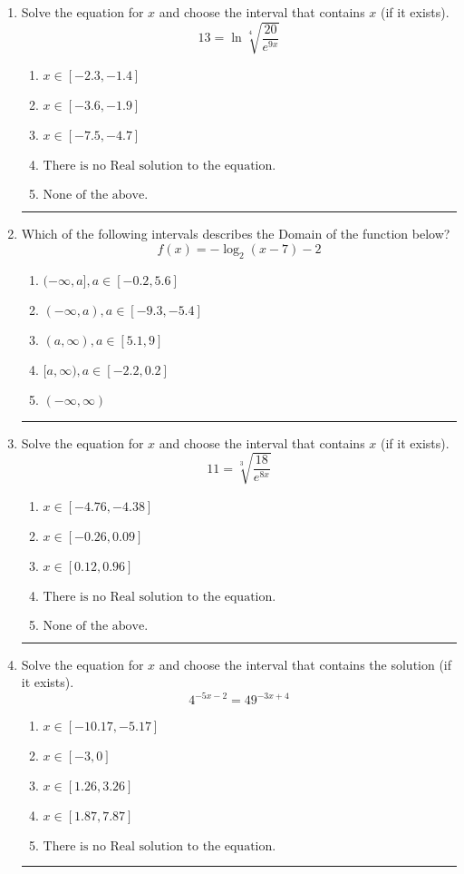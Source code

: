 \documentclass[14pt]{extbook}
\newcommand{\litem}[1]{\item#1\hspace*{-1cm}\rule{\textwidth}{0.4pt}}
\begin{document}
\begin{enumerate}
{\begin{enumerate}[label=\Alph*.]
\end{enumerate} }
\litem{
 Solve the equation for $x$ and choose the interval that contains $x$ (if it exists).\[  13 = \ln{\sqrt[4]{\frac{20}{e^{9x}}}} \]\begin{enumerate}[label=\Alph*.]
\item \( x \in [-2.3, -1.4] \)
\item \( x \in [-3.6, -1.9] \)
\item \( x \in [-7.5, -4.7] \)
\item \( \text{There is no Real solution to the equation.} \)
\item \( \text{None of the above.} \)

\end{enumerate} }
\litem{
Which of the following intervals describes the Domain of the function below?\[ f(x) = -\log_2{(x-7)}-2 \]\begin{enumerate}[label=\Alph*.]
\item \( (-\infty, a], a \in [-0.2, 5.6] \)
\item \( (-\infty, a), a \in [-9.3, -5.4] \)
\item \( (a, \infty), a \in [5.1, 9] \)
\item \( [a, \infty), a \in [-2.2, 0.2] \)
\item \( (-\infty, \infty) \)

\end{enumerate} }
\litem{
 Solve the equation for $x$ and choose the interval that contains $x$ (if it exists).\[  11 = \sqrt[3]{\frac{18}{e^{8x}}} \]\begin{enumerate}[label=\Alph*.]
\item \( x \in [-4.76, -4.38] \)
\item \( x \in [-0.26, 0.09] \)
\item \( x \in [0.12, 0.96] \)
\item \( \text{There is no Real solution to the equation.} \)
\item \( \text{None of the above.} \)

\end{enumerate} }
\litem{
Solve the equation for $x$ and choose the interval that contains the solution (if it exists).\[ 4^{-5x-2} = 49^{-3x+4} \]\begin{enumerate}[label=\Alph*.]
\item \( x \in [-10.17, -5.17] \)
\item \( x \in [-3, 0] \)
\item \( x \in [1.26, 3.26] \)
\item \( x \in [1.87, 7.87] \)
\item \( \text{There is no Real solution to the equation.} \)


\end{enumerate}}
\end{enumerate}
\end{document}
